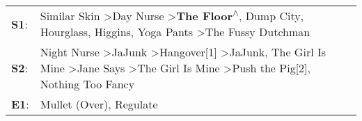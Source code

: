\begin{supertabular}{p{0.03\textwidth}p{0.92\textwidth}}
 \textbf{S1}:  &                                                                          Similar Skin\textsuperscript{} \textgreater \enspace Day Nurse\textsuperscript{} \textgreater \enspace \textbf{The Floor\textsuperscript{$\wedge$}}, \enspace Dump City\textsuperscript{}, \enspace Hourglass\textsuperscript{}, \enspace Higgins\textsuperscript{}, \enspace Yoga Pants\textsuperscript{} \textgreater \enspace The Fussy Dutchman\textsuperscript{}  \enspace  \\
 \textbf{S2}:  &  Night Nurse\textsuperscript{} \textgreater \enspace JaJunk\textsuperscript{} \textgreater \enspace Hangover[1]\textsuperscript{} \textgreater \enspace JaJunk\textsuperscript{}, \enspace The Girl Is Mine\textsuperscript{} \textgreater \enspace Jane Says\textsuperscript{} \textgreater \enspace The Girl Is Mine\textsuperscript{} \textgreater \enspace Push the Pig[2]\textsuperscript{}, \enspace Nothing Too Fancy\textsuperscript{}  \enspace  \\
 \textbf{E1}:  &                                                                                                                                                                                                                                                                                                                                                                           Mullet (Over)\textsuperscript{}, \enspace Regulate\textsuperscript{}  \enspace  \\
\end{supertabular}
